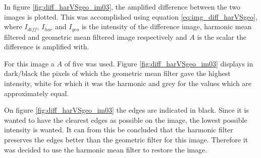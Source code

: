 In figure \ref{fig:diff_harVSgeo_im03}, the amplified difference between the two images is plotted.
This was accomplished using equation \ref{eq:img_diff_harVSgeo}, where $I_{diff}$, $I_{har}$ and $I_{geo}$ is the intensity of the difference image, harmonic mean filtered and geometric mean filtered image respectively and $A$ is the scalar the difference is amplified with.


For this image a $A$ of five was used.
Figure \ref{fig:diff_harVSgeo_im03} displays in dark/black the pixels of which the geometric mean filter gave the highest intensity, white for which it was the harmonic and grey for the values which are approximately equal.

On figure \ref{fig:diff_harVSgeo_im03} the edges are indicated in black.
Since it is wanted to have the clearest edges as possible on the image, the lowest possible intensity is wanted.
It can from this be concluded that the harmonic filter preserves the edges better than the geometric filter for this image.
Therefore it was decided to use the harmonic mean filter to restore the image.


